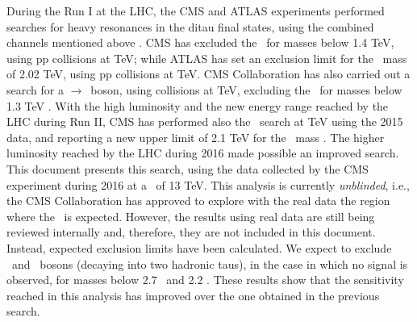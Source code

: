 
\noindent During the Run I at the LHC, the CMS and ATLAS experiments performed searches for heavy resonances 
in the ditau final states, using the combined channels mentioned above \cite{CMSZprimetotautaurun1,ATLASZprimetodileptonrun1}.
CMS has excluded the \ZprimeSSM~for masses below 1.4 TeV, using pp collisions at  TeV; while ATLAS 
has set an exclusion limit for the \ZprimeSSM~mass of 2.02 TeV, using pp collisions at  TeV. 
CMS Collaboration has also carried out a search for a \Zprime$\rightarrow$\taue\taumu~boson, using collisions at  TeV, excluding
the \ZprimeSSM~for masses below 1.3 TeV \cite{CMSZprimetotautauemu}. With the high luminosity and the new energy range 
reached by the LHC during Run II, CMS has performed also the \Zprimetotautau~search at  TeV using the 2015 data, and reporting 
a new upper limit of 2.1 TeV for the \ZprimeSSM~mass \cite{CMSZprimetotautau2015}. The higher luminosity reached 
by the LHC during 2016 made possible an improved search. This document presents this search, using 
the data collected by the CMS experiment during 2016 at a \centermassenergy~of 13 TeV. This analysis is currently \textit{unblinded}, i.e., the
CMS Collaboration has approved to explore with the 
real data the region where the \Zprimetotautau~is expected. However, the 
results using real data are still being reviewed internally and, therefore, they are 
not included in this document. Instead, expected exclusion 
limits have been calculated. We expect to exclude \ZprimeSSM~and \ZprimeTAT~bosons
(decaying into two hadronic taus), in the case in which no signal is observed, for 
masses below 2.7 \TeV~and 2.2 \TeV. These results show that 
the sensitivity reached in this analysis has improved over the one obtained in the previous
search.\\


